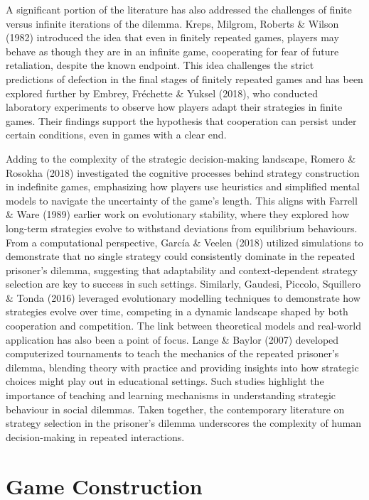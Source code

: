 \documentclass[11pt,preprint]{elsarticle}
\numberwithin{equation}{section}
\numberwithin{figure}{section}
\numberwithin{table}{section}
\begin{document}
A significant portion of the literature has also addressed the
challenges of finite versus infinite iterations of the dilemma. Kreps,
Milgrom, Roberts \& Wilson (1982) introduced the idea that even in
finitely repeated games, players may behave as though they are in an
infinite game, cooperating for fear of future retaliation, despite the
known endpoint. This idea challenges the strict predictions of defection
in the final stages of finitely repeated games and has been explored
further by Embrey, Fréchette \& Yuksel (2018), who conducted laboratory
experiments to observe how players adapt their strategies in finite
games. Their findings support the hypothesis that cooperation can
persist under certain conditions, even in games with a clear end.

Adding to the complexity of the strategic decision-making landscape,
Romero \& Rosokha (2018) investigated the cognitive processes behind
strategy construction in indefinite games, emphasizing how players use
heuristics and simplified mental models to navigate the uncertainty of
the game's length. This aligns with Farrell \& Ware (1989) earlier work
on evolutionary stability, where they explored how long-term strategies
evolve to withstand deviations from equilibrium behaviours. From a
computational perspective, García \& Veelen (2018) utilized simulations
to demonstrate that no single strategy could consistently dominate in
the repeated prisoner's dilemma, suggesting that adaptability and
context-dependent strategy selection are key to success in such
settings. Similarly, Gaudesi, Piccolo, Squillero \& Tonda (2016)
leveraged evolutionary modelling techniques to demonstrate how
strategies evolve over time, competing in a dynamic landscape shaped by
both cooperation and competition. The link between theoretical models
and real-world application has also been a point of focus. Lange \&
Baylor (2007) developed computerized tournaments to teach the mechanics
of the repeated prisoner's dilemma, blending theory with practice and
providing insights into how strategic choices might play out in
educational settings. Such studies highlight the importance of teaching
and learning mechanisms in understanding strategic behaviour in social
dilemmas. Taken together, the contemporary literature on strategy
selection in the prisoner's dilemma underscores the complexity of human
decision-making in repeated interactions.

\hypertarget{game-construction}{%
\section{Game Construction}\label{game-construction}}
\end{document}

